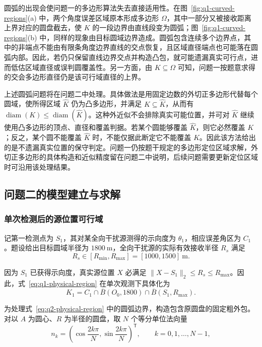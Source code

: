 \documentclass[withoutpreface,bwprint]{cumcmthesis}
\begin{document}
圆弧的出现会使问题一的多边形算法失去直接适用性。在图~\ref{fig:q1-curved-regions}(a) 中，两个角度误差区域原本形成多边形 $\Omega$，其中一部分又被接收距离上界对应的圆盘截去，使 $K$ 的一段边界由直线段变为圆弧；图~\ref{fig:q1-curved-regions}(b) 中，同样的现象由目标圆域边界造成。圆弧包含连续多个边界点，其中的非端点不能由有限条角度边界直线的交点恢复，且区域直径端点也可能落在圆弧内部。因此，若仍只保留直线边界交点并构造凸包，就可能遗漏真实可行点，进而低估区域直径或误判圆覆盖性。另一方面，由 $K\subseteq\Omega$ 可知，问题一按题意求得的交会多边形直径仍是该可行域直径的上界。

上述圆弧问题将在问题二中处理。具体做法是用固定边数的外切正多边形代替每个圆域，使所得区域 $\widehat K$ 仍为凸多边形，并满足 $K\subseteq\widehat K$，从而有 $\operatorname{diam}(K)\leq\operatorname{diam}(\widehat K)$。这种外近似不会排除真实可能位置，并可对 $\widehat K$ 继续使用凸多边形的顶点、直径和覆盖判据。若某个圆能够覆盖 $\widehat K$，则它必然覆盖 $K$；反之，某个圆不能覆盖 $\widehat K$ 时，不能仅据此断定它不能覆盖 $K$。因此该方法给出的是不遗漏真实位置的保守判定。问题一仍按题干规定的多边形定位区域求解，外切正多边形的具体构造和近似精度留在问题二中说明，后续问题需要更新定位区域时可沿用该处理结果。

\subsection{问题二的模型建立与求解}

\subsubsection{单次检测后的源位置可行域}

记第一检测点为 $S_1$，其对某全向干扰源测得的示向度为 $\theta_1$，相应误差角区为 $C_1$。题设给出目标圆域半径为 $1800\ \mathrm{m}$，全向干扰源的实际有效接收半径 $R_s$ 满足
\begin{equation}
  R_s\in[R_{\min},R_{\max}]=[1000,1500]\ \mathrm{m}.
\end{equation}

因为 $S_1$ 已获得示向度，真实源位置 $X$ 必满足 $\|X-S_1\|_2\leq R_s\leq R_{\max}$。因此，式~\eqref{eq:q1-physical-region} 在单次观测下具体化为
\begin{equation}
  K_1=C_1\cap\overline B(O_0,1800)
  \cap\overline B(S_1,R_{\max}).
  \label{eq:q2-physical-region}
\end{equation}

为处理式~\eqref{eq:q2-physical-region} 中的圆弧边界，构造包含原圆盘的固定粗外包。对以 $A$ 为圆心、$R$ 为半径的圆盘，取 $N$ 个等分单位法向量
\begin{equation}
  n_k=\left(\cos\frac{2k\pi}{N},
  \sin\frac{2k\pi}{N}\right)^{\mathsf T},
  \qquad k=0,1,\ldots,N-1,
\end{equation}
\end{document}
